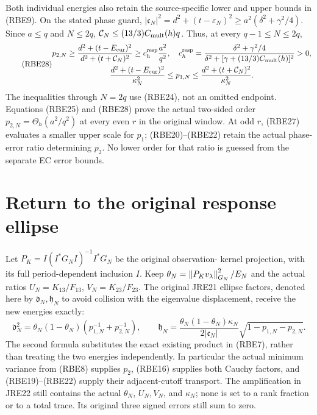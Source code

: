 Both individual energies also retain the source-specific lower and
upper bounds in (RBE9). On the stated phase guard,
\(|\mathfrak c_N|^2=d^2+(t-\varepsilon_N)^2
\ge a^2(\delta^2+\gamma^2/4)\). Since \(a\le q\) and
\(N\le2q\),
\(\mathcal C_N\le(13/3)C_{\rm mult}(h)q\).
Thus, at every \(q-1\le N\le2q\),
\begin{equation}\tag{RBE28}
 \begin{gathered}
 p_{2,N}\ge\frac{d^2+(t-E_{\rm cur})^2}
                       {d^2+(t+\mathcal C_N)^2}
 \ge c_h^{\rm resp}\frac{a^2}{q^2},\quad
 c_h^{\rm resp}=\frac{\delta^2+\gamma^2/4}
 {\delta^2+[\gamma+(13/3)C_{\rm mult}(h)]^2}>0,\\
 \frac{d^2+(t-E_{\rm cur})^2}{\kappa_N^2}
 \le p_{1,N}\le
 \frac{d^2+(t+\mathcal C_N)^2}{\kappa_N^2}.
 \end{gathered}
\end{equation}
The inequalities through \(N=2q\) use (RBE24), not an omitted
endpoint. Equations (RBE25) and (RBE28) prove the actual two-sided
order \(p_{2,N}=\Theta_h(a^2/q^2)\) at every even \(r\) in
the original window. At odd \(r\), (RBE27) evaluates a smaller
upper scale for \(p_1\); (RBE20)--(RBE22) retain the actual
phase-error ratio determining \(p_2\). No lower order for that
ratio is guessed from the separate EC error bounds.

\section{Return to the original response ellipse}

Let \(P_K=I(I^*G_NI)^{-1}I^*G_N\) be the original observation-
kernel projection, with its full period-dependent inclusion \(I\).
Keep \(\theta_N=\left\lVert P_Kv_\lambda\right\rVert_{G_N}^2/E_N\) and the
actual ratios \(U_N=K_{13}/F_{13}\), \(V_N=K_{23}/F_{23}\).
The original JRE21 ellipse factors, denoted here by
\(\mathfrak d_N,\mathfrak h_N\) to avoid collision with
the eigenvalue displacement, receive the new energies exactly:
\begin{equation}\tag{RBE29}
 \mathfrak d_N^2=\theta_N(1-\theta_N)
                   (p_{1,N}^{-1}+p_{2,N}^{-1}),\qquad
 \mathfrak h_N=
 \frac{\theta_N(1-\theta_N)\kappa_N}{2|\mathfrak c_N|}
                   \sqrt{1-p_{1,N}-p_{2,N}}.
\end{equation}
The second formula substitutes the exact existing product in
(RBE7), rather than treating the two energies independently.
In particular the actual minimum variance from (RBE8) supplies
\(p_2\), (RBE16) supplies both Cauchy factors, and (RBE19)--(RBE22)
supply their adjacent-cutoff transport. The amplification in JRE22
still contains the actual \(\theta_N\), \(U_N,V_N\), and
\(\kappa_N\); none is set to a rank fraction or to a total
trace. Its original three signed errors still sum to zero.


